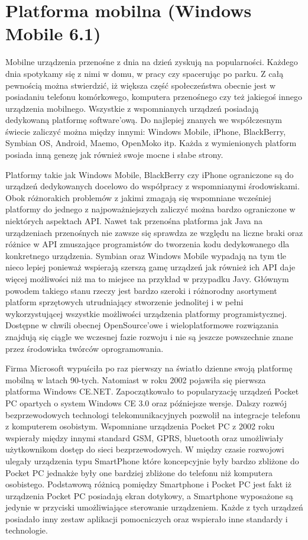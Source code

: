 \section{Platforma mobilna (Windows Mobile 6.1)}
Mobilne urządzenia przenośne z dnia na dzień zyskują na popularności. Każdego
dnia spotykamy się z nimi w domu, w pracy czy spacerując po parku. Z całą pewnością
można stwierdzić, iż większa część społeczeństwa obecnie jest w posiadaniu
telefonu komórkowego, komputera przenośnego czy też jakiegoś innego urządzenia
mobilnego. Wszystkie z wspomnianych urządzeń posiadają dedykowaną platformę
software'ową. Do najlepiej znanych we współczesnym świecie zaliczyć można między
innymi: Windows Mobile, iPhone, BlackBerry, Symbian OS, Android, Maemo, OpenMoko
itp. Każda z wymienionych platform posiada inną genezę jak również swoje mocne i
słabe strony.

Platformy takie jak Windows Mobile, BlackBerry czy iPhone ograniczone są do
urządzeń dedykowanych docelowo do współpracy z wspomnianymi środowiskami. Obok
różnorakich problemów z jakimi zmagają się wspomniane wcześniej platformy do
jednego z najpoważniejszych zaliczyć można bardzo ograniczone w niektórych
aspektach API. Nawet tak przenośna platforma jak Java na urządzeniach przenośnych
nie zawsze się sprawdza ze względu na liczne braki oraz różnice w API zmuszające
programistów do tworzenia kodu dedykowanego dla konkretnego urządzenia. Symbian
oraz Windows Mobile wypadają na tym tle nieco lepiej ponieważ wspierają szerszą
gamę urządzeń jak również ich API daje więcej możliwości niż ma to miejsce na
przykład w przypadku Javy. Głównym powodem takiego stanu rzeczy jest bardzo
szeroki i różnorodny asortyment platform sprzętowych utrudniający stworzenie
jednolitej i w pełni wykorzystującej wszystkie możliwości urządzenia platformy
programistycznej. Dostępne w chwili obecnej OpenSource'owe i wieloplatformowe
rozwiązania znajdują się ciągle we wczesnej fazie rozwoju i nie są jeszcze
powszechnie znane przez środowiska twórców oprogramowania.

Firma Microsoft wypuściła po raz pierwszy na światło dzienne swoją platformę
mobilną w latach 90-tych\cite{blog:wm-app-dev}. Natomiast w roku 2002 pojawiła
się pierwsza platforma Windows CE.NET. Zapoczątkowało to popularyzację urządzeń Pocket PC opartych o
system Windows CE 3.0 oraz późniejsze wersje. Dalszy rozwój bezprzewodowych
technologi telekomunikacyjnych pozwolił na integracje telefonu z komputerem
osobistym. Wspomniane urządzenia Pocket PC z 2002 roku wspierały między innymi
standard GSM, GPRS, bluetooth oraz umożliwiały użytkownikom dostęp do sieci
bezprzewodowych. W między czasie rozwojowi ulegały urządzenia typu SmartPhone
które koncepcyjnie były bardzo zbliżone do Pocket PC jednakże były one bardziej
zbliżone do telefonu niż komputera osobistego. Podstawową różnicą pomiędzy
Smartphone i Pocket PC jest fakt iż urządzenia Pocket PC posiadają ekran
dotykowy, a Smartphone wyposażone są jedynie w przyciski umożliwiające sterowanie
urządzeniem. Każde z tych urządzeń posiadało inny zestaw aplikacji pomocniczych
oraz wspierało inne standardy i technologie.

